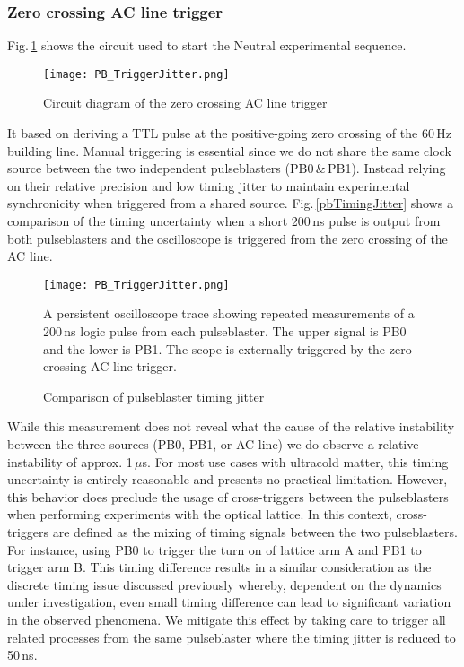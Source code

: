\subsubsection{Zero crossing AC line trigger}
Fig.\,\ref{fig:zeroCrossTrig} shows the circuit used to start the Neutral experimental sequence.
	\begin{figure}
		\centerline{
		\texttt{[image: PB\_TriggerJitter.png]}}
		\caption{Circuit diagram of the zero crossing AC line trigger}
		\label{fig:zeroCrossTrig}
	\end{figure} 
It based on deriving a TTL pulse at the positive-going zero crossing of the 60\,Hz building line.
Manual triggering is essential since we do not share the same clock source between the two independent pulseblasters (PB0\,\&\,PB1).
Instead relying on their relative precision and low timing jitter to maintain experimental synchronicity when triggered from a shared source.
Fig.\,\ref{pbTimingJitter} shows a comparison of the timing uncertainty when a short 200\,ns pulse is output from both pulseblasters and the oscilloscope is triggered from the zero crossing of the AC line.
	\begin{figure}
		\centerline{
		\texttt{[image: PB\_TriggerJitter.png]}}
		\caption{Comparison of pulseblaster timing jitter}{A persistent oscilloscope trace showing repeated measurements of a 200\,ns logic pulse from each pulseblaster. The upper signal is PB0 and the lower is PB1. The scope is externally triggered by the zero crossing AC line trigger.}
		\label{fig:pbTimingJitter}
	\end{figure} 
While this measurement does not reveal what the cause of the relative instability between the three sources (PB0, PB1, or AC line) we do observe a relative instability of approx. 1\,$\mu$s.
For most use cases with ultracold matter, this timing uncertainty is entirely reasonable and presents no practical limitation.
However, this behavior does preclude the usage of cross-triggers between the pulseblasters when performing experiments with the optical lattice.
In this context, cross-triggers are defined as the mixing of timing signals between the two pulseblasters.
For instance, using PB0 to trigger the turn on of lattice arm A and PB1 to trigger arm B.
This timing difference results in a similar consideration as the discrete timing issue discussed previously whereby, dependent on the dynamics under investigation, even small timing difference can lead to significant variation in the observed phenomena.
We mitigate this effect by taking care to trigger all related processes from the same pulseblaster where the timing jitter is reduced to 50\,ns.

